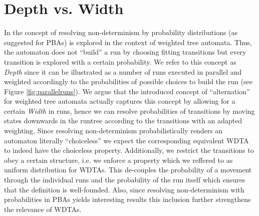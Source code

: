 \section{Depth vs. Width}
In \cite[Chapter 4]{RandAutoInfTrees} the concept of resolving non-determinism
by probability distributions (as suggested for \acp{PBA}) is explored in the
context of weighted tree automata. Thus, the automaton does not
\enquote{build} a run by choosing fitting transitions but every transition is
explored with a certain probability. We refer to this concept as \emph{Depth}
since it can be illustrated as a number of runs executed in parallel and
weighted accordingly to the probabilities of possible choices to build the run
(see Figure \ref{fig:parallelruns}). We argue that the introduced concept of
\enquote{alternation} for weighted tree automata actually captures this concept
by allowing for a certain \emph{Width} in runs, hence we can resolve
probabilities of transitions by moving states downwards in the runtree according
to the transitions with an adapted weighting. Since resolving non-determinism
probabilistically renders an automaton literally \enquote{choiceless} we expect
the corresponding equivalent \ac{WDTA} to indeed have the choiceless property.
Additionally, we restrict the transitions to obey a certain structure, i.e. we
enforce a property which we reffered to as uniform distribution for \acp{WDTA}.
This de-couples the probability of a movement through the individual runs and
the probability of the run itself which ensures that the definition is
well-founded. Also, since resolving non-determinism with probabilities in
\acp{PBA} yields interesting results this inclusion further strengthens the
relevance of \acp{WDTA}. 

